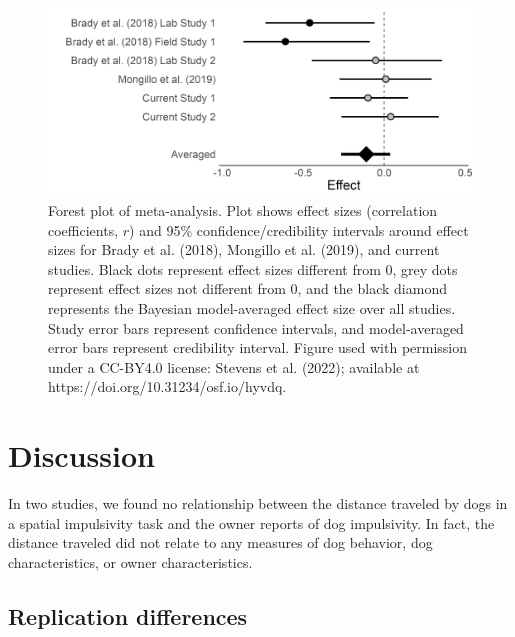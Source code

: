 \documentclass[
  pub,floatsintext]{apa6}
\begin{document}
\begin{figure}

{\centering \includegraphics[width=1\linewidth]{figures/forestplot_bf} 

}

\caption{Forest plot of meta-analysis. Plot shows effect sizes (correlation coefficients, $r$) and 95\% confidence/credibility intervals around effect sizes for Brady et al. (2018), Mongillo et al. (2019), and current studies. Black dots represent effect sizes different from 0, grey dots represent effect sizes not different from 0, and the black diamond represents the Bayesian model-averaged effect size over all studies. Study error bars represent confidence intervals, and model-averaged error bars represent credibility interval. Figure used with permission under a CC-BY4.0 license: Stevens et al. (2022); available at https://doi.org/10.31234/osf.io/hyvdq.}\label{fig:forestplot}
\end{figure}

\hypertarget{discussion}{%
\section{Discussion}\label{discussion}}

In two studies, we found no relationship between the distance traveled by dogs in a spatial impulsivity task and the owner reports of dog impulsivity. In fact, the distance traveled did not relate to any measures of dog behavior, dog characteristics, or owner characteristics.

\hypertarget{replication-differences}{%
\subsection{Replication differences}\label{replication-differences}}
\end{document}
